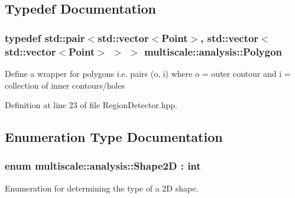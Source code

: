 \subsection{Typedef Documentation}
\hypertarget{namespacemultiscale_1_1analysis_a37bc63d1d786b35968c450508f8bcbd3}{
\subsubsection[{Polygon}]{\setlength{\rightskip}{0pt plus 5cm}typedef std\-::pair$<$std\-::vector$<$Point$>$, std\-::vector$<$std\-::vector$<$Point$>$ $>$ $>$ {\bf multiscale\-::analysis\-::\-Polygon}}}\label{namespacemultiscale_1_1analysis_a37bc63d1d786b35968c450508f8bcbd3}
Define a wrapper for polygons i.\-e. pairs (o, i) where o = outer contour and i = collection of inner contours/holes 

Definition at line 23 of file Region\-Detector.\-hpp.



\subsection{Enumeration Type Documentation}
\hypertarget{namespacemultiscale_1_1analysis_ad895735ef4c40ec7f58424c33cba1b88}{
\subsubsection[{Shape2\-D}]{\setlength{\rightskip}{0pt plus 5cm}enum {\bf multiscale\-::analysis\-::\-Shape2\-D} \-: int}}\label{namespacemultiscale_1_1analysis_ad895735ef4c40ec7f58424c33cba1b88}


Enumeration for determining the type of a 2\-D shape. 


